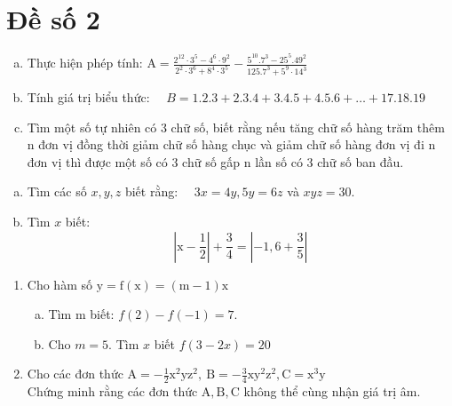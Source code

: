 \section{Đề số 2}

\begin{bt} 
    \begin{enumerate}[a.]
        \item Thực hiện phép tính: $\mathrm{A}=\frac{2^{12} \cdot 3^5-4^6 \cdot 9^2}{2^2 \cdot 3^6+8^4 \cdot 3^5}-\frac{5^{10} .7^3-25^5 .49^2}{125.7^3+5^9 \cdot 14^3}$
        \item Tính giá trị biểu thức: $\quad B=1.2 .3+2.3 .4+3.4 .5+4.5 .6+\ldots+17.18 .19$
        \item Tìm một số tự nhiên có 3 chữ số, biết rằng nếu tăng chữ số hàng trăm thêm $\mathrm{n}$ đơn vị đồng thời giảm chữ số hàng chục và giảm chữ số hàng đơn vị đi n đơn vị thì được một số có 3 chữ số gấp n lần số có 3 chữ số ban đầu.
    \end{enumerate}
\loigiai{} 
\end{bt}

\begin{bt}
    \begin{enumerate}[a.]
        \item Tìm các số $x, y, z$ biết rằng: $\quad 3 x=4 y, 5 y=6 z$ và $x y z=30$.
        \item Tìm $x$ biết:
    $$
    \left|\mathrm{x}-\frac{1}{2}\right|+\frac{3}{4}=\left|-1,6+\frac{3}{5}\right|
    $$
    \end{enumerate}
\loigiai{} 
\end{bt}

\begin{bt}
    \begin{enumerate}[1.]
        \item Cho hàm số $\mathrm{y}=\mathrm{f}(\mathrm{x})=(\mathrm{m}-1) \mathrm{x}$
           \begin{enumerate}[a.]
            \item Tìm m biết: $f(2)-f(-1)=7$.
            \item Cho $m=5$. Tìm $x$ biết $f(3-2 x)=20$
           \end{enumerate}
        \item Cho các đơn thức $\mathrm{A}=-\frac{1}{2} \mathrm{x}^2 \mathrm{yz}^2, \mathrm{~B}=-\frac{3}{4} \mathrm{xy}^2 \mathrm{z}^2, \mathrm{C}=\mathrm{x}^3 \mathrm{y}$\\
        Chứng minh rằng các đơn thức $\mathrm{A}, \mathrm{B}, \mathrm{C}$ không thể cùng nhận giá trị âm.
    \end{enumerate}
\loigiai{} 
\end{bt}

